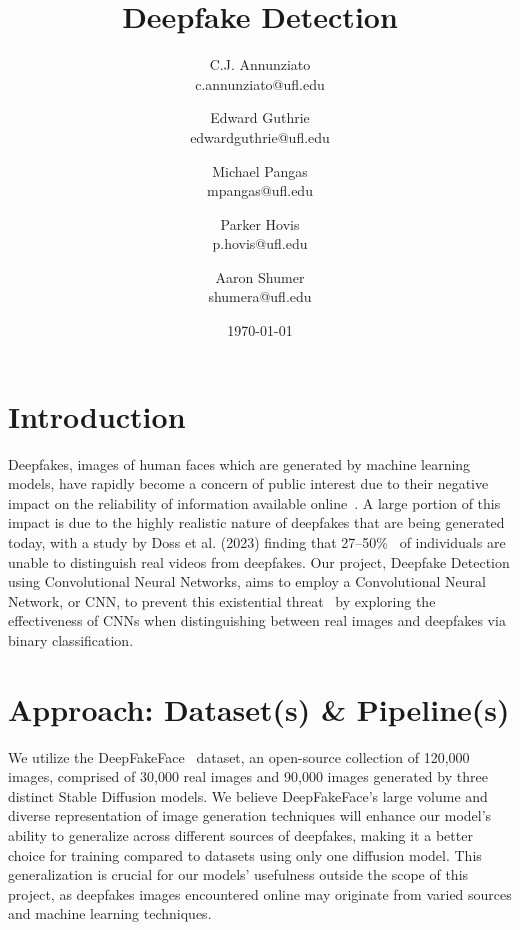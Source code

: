 \documentclass[10pt]{article}
\title{Deepfake Detection\\}
\author{
        C.J. Annunziato \\
        c.annunziato@ufl.edu\\
        \and
        Edward Guthrie \\
        edwardguthrie@ufl.edu\\
        \and
        Michael Pangas \\
        mpangas@ufl.edu\\
        \and
        Parker Hovis \\
        p.hovis@ufl.edu\\
        \and
        Aaron Shumer \\
        shumera@ufl.edu\\
}
\date{\today}
\begin{document}

\maketitle




\section{Introduction}


\quad Deepfakes, images of human faces which are generated by machine learning models, have rapidly become a concern of public interest due to their negative impact on the reliability of information available online~\cite{fallis2021epistemic}. A large portion of this impact is due to the highly realistic nature of deepfakes that are being generated today, with a study by Doss et al. (2023) finding that 27–50\%~\cite{doss2023deepfakes} of individuals are unable to distinguish real videos from deepfakes. Our project, Deepfake Detection using Convolutional Neural Networks, aims to employ a Convolutional Neural Network, or CNN, to prevent this existential threat~\cite{fallis2021epistemic} by exploring the effectiveness of CNNs when distinguishing between real images and deepfakes via binary classification. 


\section{Approach: Dataset(s) \& Pipeline(s)}

\quad We utilize the DeepFakeFace ~\cite{song2023robustness}dataset, an open-source collection of 120,000 images, comprised of 30,000 real images and 90,000 images generated by three distinct Stable Diffusion models. We believe DeepFakeFace's large volume and diverse representation of image generation techniques will enhance our model's ability to generalize across different sources of deepfakes, making it a better choice for training compared to datasets using only one diffusion model. This generalization is crucial for our models' usefulness outside the scope of this project, as deepfakes images encountered online may originate from varied sources and machine learning techniques.
\end{document}

